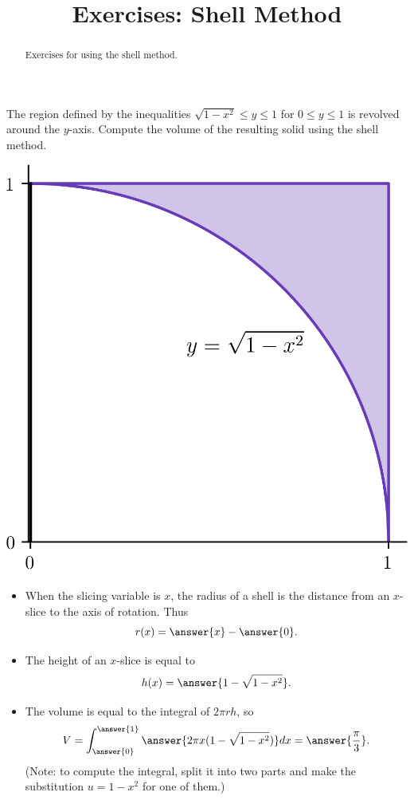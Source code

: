 \documentclass{ximera}
\title{Exercises: Shell Method}
\begin{document}
\begin{abstract}
Exercises for using the shell method.
\end{abstract}
\maketitle

\begin{exercise}
The region defined by the inequalities $\sqrt{1-x^2} \leq y \leq 1$ for $0 \leq y \leq 1$ is revolved around the $y$-axis. Compute the volume of the resulting solid using the shell method.
\begin{center}
\begin{image}
\includegraphics{shell/shell03.png}
\end{image}
\end{center}
\begin{itemize}
\item When the slicing variable is $x$, the radius of a shell is the  distance from an $x$-slice to the axis of rotation. Thus
\[ r(x) = \answer{x} - \answer{0}. \]
\item The height of an $x$-slice is equal to
\[ h(x) = \answer{1 - \sqrt{1 - x^2}}. \]
\item The volume is equal to the integral of $2 \pi r h$, so 
\[ V = \int_{\answer{0}}^{\answer{1}} \answer{2 \pi x ( 1 - \sqrt{1-x^2}) } dx = \answer{\frac{\pi}{3}}. \]
(Note: to compute the integral, split it into two parts and make the substitution $u = 1-x^2$ for one of them.)
\end{itemize}
\end{exercise}
\end{document}
